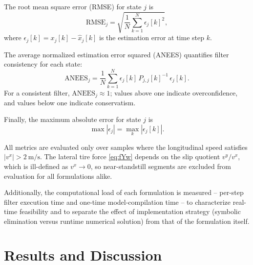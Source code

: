 \documentclass[conference]{IEEEtran}
\begin{document}
The root mean square error (RMSE) for state $j$ is
\begin{equation}
    \mathrm{RMSE}_j = \sqrt{\frac{1}{N}\sum_{k=1}^{N} \epsilon_j[k]^2},
\end{equation}
where $\epsilon_j[k] = x_j[k] - \hat{x}_j[k]$ is the estimation error at time step $k$.

The average normalized estimation error squared (ANEES) quantifies filter consistency for each state:
\begin{equation}
    \mathrm{ANEES}_j = \frac{1}{N}\sum_{k=1}^{N} \epsilon_j[k]\,P_{j,j}[k]^{-1}\,\epsilon_j[k].
\end{equation}
For a consistent filter, $\mathrm{ANEES}_j \approx 1$; values above one indicate overconfidence, and values below one indicate conservatism.

Finally, the maximum absolute error for state $j$ is
\begin{equation}
    \max|\epsilon_j| = \max_{k} |\epsilon_j[k]|.
\end{equation}

All metrics are evaluated only over samples where the longitudinal speed satisfies $|v^x| > 2~\mathrm{m/s}$. The lateral tire force \eqref{eq:fYw} depends on the slip quotient $v^y/v^x$, which is ill-defined as $v^x \to 0$, so near-standstill segments are excluded from evaluation for all formulations alike.

Additionally, the computational load of each formulation is measured -- per-step filter execution time and one-time model-compilation time -- to characterize real-time feasibility and to separate the effect of implementation strategy (symbolic elimination versus runtime numerical solution) from that of the formulation itself.

\section{Results and Discussion}
\label{sec:results}
\end{document}
